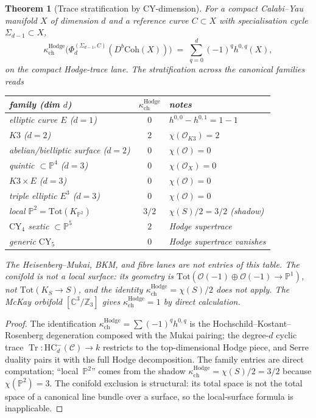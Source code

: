 \documentclass[11pt]{article}
\theoremstyle{plain}
\newtheorem{theorem}{Theorem}[section]
\theoremstyle{definition}
\theoremstyle{remark}
\newcommand{\cC}{\mathcal{C}}
\newcommand{\cO}{\mathcal{O}}
\newcommand{\bC}{\mathbb{C}}
\newcommand{\bP}{\mathbb{P}}
\newcommand{\bZ}{\mathbb{Z}}
\newcommand{\Tr}{\operatorname{Tr}}
\newcommand{\HC}{\mathrm{HC}}
\newcommand{\Coh}{\mathrm{Coh}}
\begin{document}
\begin{theorem}[Trace stratification by
 CY-dimension]\label{thm:phi-kappa-stratification}
For a compact Calabi--Yau manifold $X$ of dimension $d$ and a
reference curve $C \subset X$ with specialisation cycle
$\Sigma_{d-1} \subset X$,
\begin{equation}\label{eq:phi-kappa-hodge-supertrace}
\kappa_{\mathrm{ch}}^{\mathrm{Hodge}}\bigl(\Phi_d^{(\Sigma_{d-1},C)}(D^b\Coh(X))\bigr)
\;=\; \sum_{q=0}^{d} (-1)^q h^{0,q}(X),
\end{equation}
on the compact Hodge-trace lane. The stratification across the canonical
families reads
\begin{center}\small
\renewcommand{\arraystretch}{1.2}
\begin{tabular}{lcl}
\toprule
family (dim $d$) & $\kappa_{\mathrm{ch}}^{\mathrm{Hodge}}$ & notes \\
\midrule
elliptic curve $E$ ($d=1$) & $0$ & $h^{0,0}-h^{0,1}=1-1$ \\
$K3$ ($d=2$) & $2$ & $\chi(\cO_{K3}) = 2$ \\
abelian/bielliptic surface ($d=2$) & $0$ & $\chi(\cO) = 0$ \\
quintic $\subset \bP^4$ ($d=3$) & $0$ & $\chi(\cO_X) = 0$ \\
$K3 \times E$ ($d=3$) & $0$ & $\chi(\cO) = 0$ \\
triple elliptic $E^3$ ($d=3$) & $0$ & $\chi(\cO) = 0$ \\
local $\bP^2 = \mathrm{Tot}(K_{\bP^2})$ & $3/2$
  & $\chi(S)/2 = 3/2$ (shadow) \\
$\mathrm{CY}_4$ sextic $\subset \bP^5$ & $2$
  & Hodge supertrace \\
generic $\mathrm{CY}_5$ & $0$ & Hodge supertrace vanishes \\
\bottomrule
\end{tabular}
\end{center}
The Heisenberg--Mukai, BKM, and fibre lanes are not entries of this
table.  The conifold is \emph{not} a local surface: its geometry is
$\mathrm{Tot}(\cO(-1) \oplus \cO(-1) \to \bP^1)$, not
$\mathrm{Tot}(K_S \to S)$, and the identity
$\kappa_{\mathrm{ch}}^{\mathrm{Hodge}} = \chi(S)/2$ does not apply. The McKay
orbifold $[\bC^3/\bZ_3]$ gives
$\kappa_{\mathrm{ch}}^{\mathrm{Hodge}} = 1$ by direct calculation.
\end{theorem}

\begin{proof}
The identification
$\kappa_{\mathrm{ch}}^{\mathrm{Hodge}} = \sum(-1)^q h^{0,q}$ is
the Hochschild--Kostant--Rosenberg degeneration composed with the
Mukai pairing; the degree-$d$ cyclic trace $\Tr\colon \HC^-_d(\cC) \to k$
restricts to the top-dimensional Hodge piece, and Serre duality
pairs it with the full Hodge decomposition. The family entries are
direct computation; ``local~$\bP^2$'' comes from the shadow
$\kappa_{\mathrm{ch}}^{\mathrm{Hodge}} = \chi(S)/2 = 3/2$ because
$\chi(\bP^2) = 3$. The conifold exclusion is structural: its
total space is not the total space of a canonical line bundle over
a surface, so the local-surface formula is inapplicable.
\end{proof}
\end{document}
